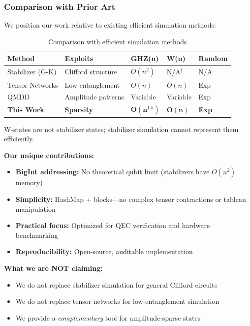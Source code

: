 \documentclass[11pt,twocolumn]{article}
\begin{document}
\subsubsection{Comparison with Prior Art}

We position our work relative to existing efficient simulation methods:

\begin{table}[H]
\centering
\caption{Comparison with efficient simulation methods}
\label{tab:priorart}
\begin{threeparttable}
\begin{tabular}{@{}lllll@{}}
\toprule
Method & Exploits & GHZ(n) & W(n) & Random \\
\midrule
Stabilizer (G-K) & Clifford structure & $O(n^2)$ & N/A$^\dagger$ & N/A \\
Tensor Networks & Low entanglement & $O(n)$ & $O(n)$ & Exp \\
QMDD & Amplitude patterns & Variable & Variable & Exp \\
\textbf{This Work} & \textbf{Sparsity} & $\mathbf{O(n^{1.5})}$ & $\mathbf{O(n)}$ & \textbf{Exp} \\
\bottomrule
\end{tabular}
\begin{tablenotes}
\small
\item[$\dagger$] W-states are not stabilizer states; stabilizer simulation cannot represent them efficiently.
\end{tablenotes}
\end{threeparttable}
\end{table}

\textbf{Our unique contributions:}
\begin{itemize}
    \item \textbf{BigInt addressing:} No theoretical qubit limit (stabilizers have $O(n^2)$ memory)
    \item \textbf{Simplicity:} HashMap + blocks---no complex tensor contractions or tableau manipulation
    \item \textbf{Practical focus:} Optimized for QEC verification and hardware benchmarking
    \item \textbf{Reproducibility:} Open-source, auditable implementation
\end{itemize}

\textbf{What we are NOT claiming:}
\begin{itemize}
    \item We do not replace stabilizer simulation for general Clifford circuits
    \item We do not replace tensor networks for low-entanglement simulation
    \item We provide a \emph{complementary} tool for amplitude-sparse states
\end{itemize}
\end{document}
